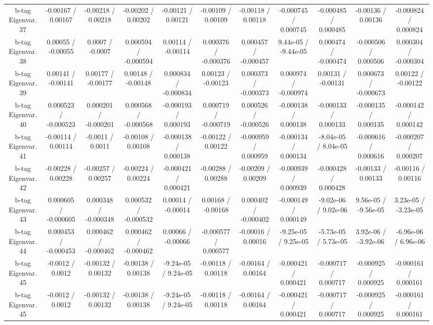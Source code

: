 \begin{table}[htbp]
\begin{center}
\begin{tabular}{|c|c|c|c|c|c|c|c|c|c|c|}
  b-tag Eigenvar. 37 & -0.00167 / 0.00167 & -0.00218 / 0.00218 & -0.00202 / 0.00202 & -0.00121 / 0.00121 & -0.00109 / 0.00109 & -0.00118 / 0.00118 & -0.000745 / 0.000745 & -0.000485 / 0.000485 & -0.00136 / 0.00136 & -0.000824 / 0.000824 \\ 
  b-tag Eigenvar. 38 & 0.00055 / -0.00055 & 0.0007 / -0.0007 & 0.000594 / -0.000594 & 0.00114 / -0.00114 & 0.000376 / -0.000376 & 0.000457 / -0.000457 & 9.44e-05 / -9.44e-05 & 0.000474 / -0.000474 & -0.000506 / 0.000506 & 0.000304 / -0.000304 \\ 
  b-tag Eigenvar. 39 & 0.00141 / -0.00141 & 0.00177 / -0.00177 & 0.00148 / -0.00148 & 0.000834 / -0.000834 & 0.00123 / -0.00123 & 0.000373 / -0.000373 & 0.000974 / -0.000974 & 0.00131 / -0.00131 & 0.000673 / -0.000673 & 0.00122 / -0.00122 \\ 
  b-tag Eigenvar. 40 & 0.000523 / -0.000523 & 0.000201 / -0.000201 & 0.000568 / -0.000568 & -0.000193 / 0.000193 & 0.000719 / -0.000719 & 0.000526 / -0.000526 & -0.000138 / 0.000138 & -0.000133 / 0.000133 & -0.000135 / 0.000135 & -0.000142 / 0.000142 \\ 
  b-tag Eigenvar. 41 & -0.00114 / 0.00114 & -0.0011 / 0.0011 & -0.00108 / 0.00108 & -0.000138 / 0.000138 & -0.00122 / 0.00122 & -0.000959 / 0.000959 & -0.000134 / 0.000134 & -8.04e-05 / 8.04e-05 & -0.000616 / 0.000616 & -0.000207 / 0.000207 \\ 
  b-tag Eigenvar. 42 & -0.00228 / 0.00228 & -0.00257 / 0.00257 & -0.00224 / 0.00224 & -0.000421 / 0.000421 & -0.00288 / 0.00288 & -0.00209 / 0.00209 & -0.000939 / 0.000939 & -0.000428 / 0.000428 & -0.00133 / 0.00133 & -0.00116 / 0.00116 \\ 
  b-tag Eigenvar. 43 & 0.000605 / -0.000605 & 0.000348 / -0.000348 & 0.000532 / -0.000532 & 0.00014 / -0.00014 & 0.00168 / -0.00168 & 0.000402 / -0.000402 & -0.000149 / 0.000149 & -9.02e-06 / 9.02e-06 & 9.56e-05 / -9.56e-05 & 3.23e-05 / -3.23e-05 \\ 
  b-tag Eigenvar. 44 & 0.000453 / -0.000453 & 0.000462 / -0.000462 & 0.000462 / -0.000462 & 0.00066 / -0.00066 & -0.000577 / 0.000577 & -0.00016 / 0.00016 & -9.25e-05 / 9.25e-05 & -5.73e-05 / 5.73e-05 & 3.92e-06 / -3.92e-06 & -6.96e-06 / 6.96e-06 \\ 
  b-tag Eigenvar. 45 & -0.0012 / 0.0012 & -0.00132 / 0.00132 & -0.00138 / 0.00138 & -9.24e-05 / 9.24e-05 & -0.00118 / 0.00118 & -0.00164 / 0.00164 & -0.000421 / 0.000421 & -0.000717 / 0.000717 & -0.000925 / 0.000925 & -0.000161 / 0.000161 \\ 
  b-tag Eigenvar. 45 & -0.0012 / 0.0012 & -0.00132 / 0.00132 & -0.00138 / 0.00138 & -9.24e-05 / 9.24e-05 & -0.00118 / 0.00118 & -0.00164 / 0.00164 & -0.000421 / 0.000421 & -0.000717 / 0.000717 & -0.000925 / 0.000925 & -0.000161 / 0.000161 \\ 

\end{tabular}
\end{center}
\end{table}
